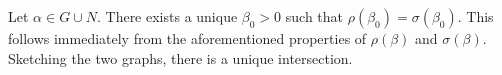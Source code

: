 \begin{lemma}Let $\alpha\in G\cup N$. There exists a unique $\beta_0>0$ such that $\rho(\beta_0)=\sigma(\beta_0)$.
This follows immediately from the aforementioned properties of $\rho(\beta)$ and $\sigma(\beta)$. Sketching the two graphs, there is a unique intersection.
\end{lemma}